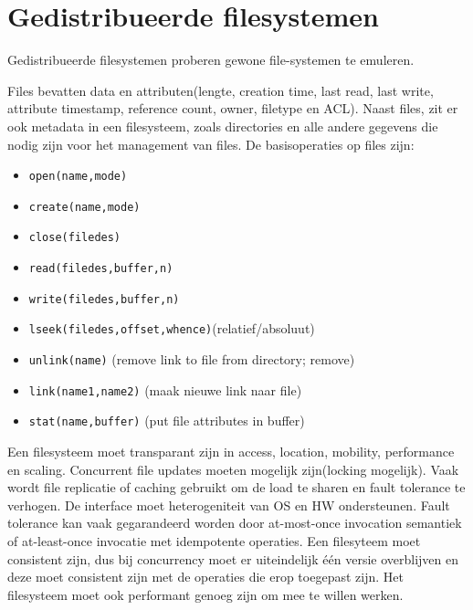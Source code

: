 \documentclass[../samenvatting.tex]{subfiles}
\begin{document}
\chapter{Gedistribueerde filesystemen}
Gedistribueerde filesystemen proberen gewone file-systemen te emuleren. 

Files bevatten data en attributen(lengte, creation time, last read, last write, attribute timestamp, reference count, owner, filetype en ACL). Naast files, zit er ook metadata in een filesysteem, zoals directories en alle andere gegevens die nodig zijn voor het management van files. De basisoperaties op files zijn:
\begin{itemize}
	\item \texttt{open(name,mode)}
	\item \texttt{create(name,mode)}
	\item \texttt{close(filedes)}
	\item \texttt{read(filedes,buffer,n)}
	\item \texttt{write(filedes,buffer,n)}
	\item \texttt{lseek(filedes,offset,whence)}(relatief/absoluut)
	\item \texttt{unlink(name)} (remove link to file from directory; remove)
	\item \texttt{link(name1,name2)} (maak nieuwe link naar file)
	\item \texttt{stat(name,buffer)} (put file attributes in buffer)
\end{itemize}

Een filesysteem moet transparant zijn in access, location, mobility, performance en scaling. Concurrent file updates moeten mogelijk zijn(locking mogelijk). Vaak wordt file replicatie of caching gebruikt om de load te sharen en fault tolerance te verhogen. De interface moet heterogeniteit van OS en HW ondersteunen. Fault tolerance kan vaak gegarandeerd worden door at-most-once invocation semantiek of at-least-once invocatie met idempotente operaties. Een filesyteem moet consistent zijn, dus bij concurrency moet er uiteindelijk één versie overblijven en deze moet consistent zijn met de operaties die erop toegepast zijn. Het filesysteem moet ook performant genoeg zijn om mee te willen werken.
\end{document}
